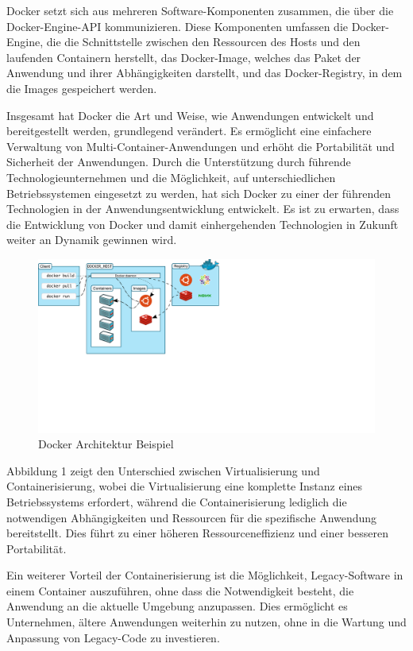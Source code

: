 Docker setzt sich aus mehreren Software-Komponenten zusammen, die über die Docker-Engine-API kommunizieren. Diese Komponenten umfassen die Docker-Engine, die die Schnittstelle zwischen den Ressourcen des Hosts und den laufenden Containern herstellt, das Docker-Image, welches das Paket der Anwendung und ihrer Abhängigkeiten darstellt, und das Docker-Registry, in dem die Images gespeichert werden.

Insgesamt hat Docker die Art und Weise, wie Anwendungen entwickelt und bereitgestellt werden, grundlegend verändert. Es ermöglicht eine einfachere Verwaltung von Multi-Container-Anwendungen und erhöht die Portabilität und Sicherheit der Anwendungen. Durch die Unterstützung durch führende Technologieunternehmen und die Möglichkeit, auf unterschiedlichen Betriebssystemen eingesetzt zu werden, hat sich Docker zu einer der führenden Technologien in der Anwendungsentwicklung entwickelt. Es ist zu erwarten, dass die Entwicklung von Docker und damit einhergehenden Technologien in Zukunft weiter an Dynamik gewinnen wird. \cite{dockeroverview}

\begin{figure}[htbp]
	\includegraphics[scale=0.25]{gfx/https___docs.docker.com_engine_images_architecture.svg.pdf}
	\caption{Docker Architektur Beispiel}
\end{figure}



Abbildung 1 zeigt den Unterschied zwischen Virtualisierung und Containerisierung, wobei die Virtualisierung eine komplette Instanz eines Betriebssystems erfordert, während die Containerisierung lediglich die notwendigen Abhängigkeiten und Ressourcen für die spezifische Anwendung bereitstellt. Dies führt zu einer höheren Ressourceneffizienz und einer besseren Portabilität.

Ein weiterer Vorteil der Containerisierung ist die Möglichkeit, Legacy-Software in einem Container auszuführen, ohne dass die Notwendigkeit besteht, die Anwendung an die aktuelle Umgebung anzupassen.
Dies ermöglicht es Unternehmen, ältere Anwendungen weiterhin zu nutzen, ohne in die Wartung und Anpassung von Legacy-Code zu investieren.

